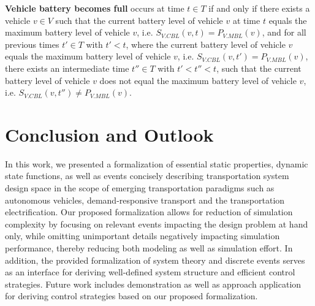 \documentclass[graybox]{svmult}
\begin{document}
\vspace{4mm}
\noindent
\textbf{Vehicle battery becomes full}
occurs at time $t \in T$ if and only if there exists a vehicle $v \in V$ such that the current battery level of vehicle $v$ at time $t$ equals the maximum battery level of vehicle $v$, i.e. $S_{V.CBL}(v,t) = P_{V.MBL}(v)$, and for all previous times $t' \in T$ with $t' < t$, where the current battery level of vehicle $v$ equals the maximum battery level of vehicle $v$, i.e. $S_{V.CBL}(v,t') = P_{V.MBL}(v)$, there exists an intermediate time $t'' \in T$ with $t' < t'' < t$, such that the current battery level of vehicle $v$ does not equal the maximum battery level of vehicle $v$, i.e. $S_{V.CBL}(v,t'') \neq P_{V.MBL}(v)$.

\vspace{-2mm}

\section{Conclusion and Outlook}
\label{sec:con}
In this work, we presented a formalization of essential static properties, dynamic state functions, as well as events concisely describing transportation system design space in the scope of emerging transportation paradigms such as autonomous vehicles, demand-responsive transport and the transportation electrification. Our proposed formalization allows for reduction of simulation complexity by focusing on relevant events impacting the design problem at hand only, while omitting unimportant details negatively impacting simulation performance, thereby reducing both modeling as well as simulation effort. In addition, the provided formalization of system theory and discrete events serves as an interface for deriving well-defined system structure and efficient control strategies. Future work includes demonstration as well as approach application for deriving control strategies based on our proposed formalization.

\vspace{-2mm}



\end{document}
